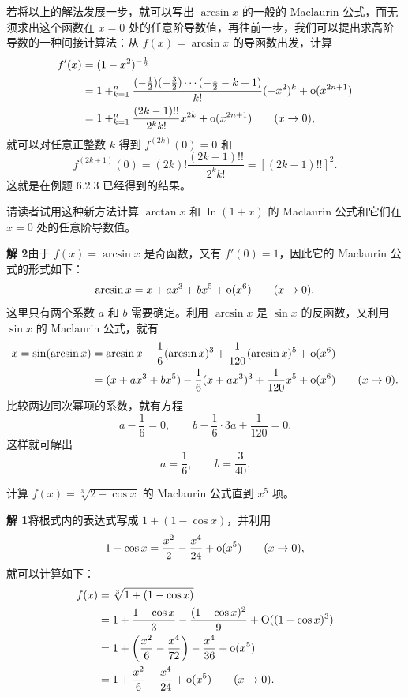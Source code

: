\begin{xremark}
若将以上的解法发展一步，就可以写出 $\arcsin x$ 的一般的 Maclaurin 公式，而无须求出这个函数在 $x=0$ 处的任意阶导数值，再往前一步，我们可以提出求高阶导数的一种间接计算法：从 $f(x)=\arcsin x$ 的导函数出发，计算
\[
  \begin{aligned}
  f'(x)&=(1-x^2)^{-\frac12}\\
  &=1+\relax_{k=1}^n
  \frac{(-\frac12)(-\frac32)\cdots(-\frac12-k+1)}{k!}(-x^2)^k
  +\mathrm{o}(x^{2n+1})\\
  &=1+\relax_{k=1}^n\frac{(2k-1)!!}{2^k k!}x^{2k}+\mathrm{o}(x^{2n+1})\qquad(x\to0),
  \end{aligned}
\]
就可以对任意正整数 $k$ 得到 $f^{(2k)}(0)=0$ 和
\[
  f^{(2k+1)}(0)=(2k)!\frac{(2k-1)!!}{2^k k!}=[(2k-1)!!]^2.
\]
这就是在例题 6.2.3 已经得到的结果。

请读者试用这种新方法计算 $\arctan x$ 和 $\ln(1+x)$ 的 Maclaurin 公式和它们在 $x=0$ 处的任意阶导数值。
\end{xremark}

\begin{xsolution}
\textbf{解 2}\quad 由于 $f(x)=\arcsin x$ 是奇函数，又有 $f'(0)=1$，因此它的 Maclaurin 公式的形式如下：
\[
  \arcsin x=x+ax^3+bx^5+\mathrm{o}(x^6)\qquad(x\to0).
\]
这里只有两个系数 $a$ 和 $b$ 需要确定。利用 $\arcsin x$ 是 $\sin x$ 的反函数，又利用 $\sin x$ 的 Maclaurin 公式，就有
\[
  \begin{aligned}
  x=\sin(\arcsin x)
  &=\arcsin x-\frac16(\arcsin x)^3+\frac{1}{120}(\arcsin x)^5+\mathrm{o}(x^6)\\
  &=(x+ax^3+bx^5)-\frac16(x+ax^3)^3+\frac{1}{120}x^5+\mathrm{o}(x^6)\qquad(x\to0).
  \end{aligned}
\]
比较两边同次幂项的系数，就有方程
\[
  a-\frac16=0,\qquad b-\frac16\cdot3a+\frac{1}{120}=0.
\]
这样就可解出
\[
  a=\frac16,\qquad b=\frac{3}{40}.
\]
\end{xsolution}

\begin{xexample}[7.2.2]
计算 $f(x)=\sqrt[3]{2-\cos x}$ 的 Maclaurin 公式直到 $x^5$ 项。
\end{xexample}
\begin{xsolution}
\textbf{解 1}\quad 将根式内的表达式写成 $1+(1-\cos x)$，并利用
\[
  1-\cos x=\frac{x^2}{2}-\frac{x^4}{24}+\mathrm{o}(x^5)\qquad(x\to0),
\]
就可以计算如下：
\[
  \begin{aligned}
  f(x)&=\sqrt[3]{1+(1-\cos x)}\\
  &=1+\frac{1-\cos x}{3}-\frac{(1-\cos x)^2}{9}+\mathrm{O}((1-\cos x)^3)\\
  &=1+\left(\frac{x^2}{6}-\frac{x^4}{72}\right)-\frac{x^4}{36}+\mathrm{o}(x^5)\\
  &=1+\frac{x^2}{6}-\frac{x^4}{24}+\mathrm{o}(x^5)\qquad(x\to0).
  \end{aligned}
\]
\end{xsolution}

